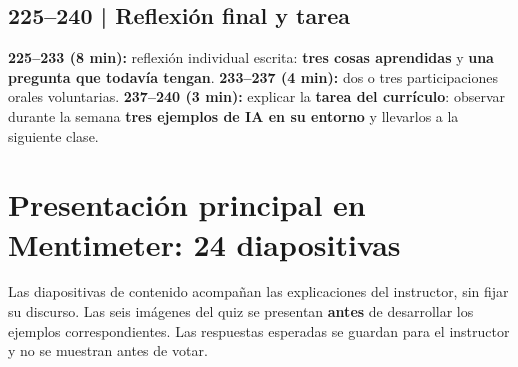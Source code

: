 \documentclass[11pt,a4paper]{article}
\begin{document}
\subsection{225--240 | Reflexión final y tarea}
\textbf{225--233 (8 min):} reflexión individual escrita: \textbf{tres cosas aprendidas} y \textbf{una pregunta que todavía tengan}. \textbf{233--237 (4 min):} dos o tres participaciones orales voluntarias. \textbf{237--240 (3 min):} explicar la \textbf{tarea del currículo}: observar durante la semana \textbf{tres ejemplos de IA en su entorno} y llevarlos a la siguiente clase.

\section{Presentación principal en Mentimeter: 24 diapositivas}
Las diapositivas de contenido acompañan las explicaciones del instructor, sin fijar su discurso. Las seis imágenes del quiz se presentan \textbf{antes} de desarrollar los ejemplos correspondientes. Las respuestas esperadas se guardan para el instructor y no se muestran antes de votar.
\end{document}
